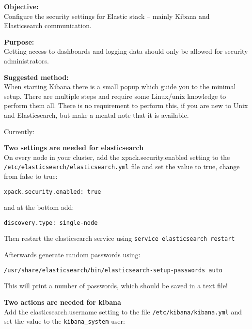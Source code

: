 \documentclass[a4paper,11pt,notitlepage]{report}
\begin{document}
{\bf Objective:}\\
Configure the security settings for Elastic stack -- mainly Kibana and Elasticsearch communication.

{\bf Purpose:}\\
Getting access to dashboards and logging data should only be allowed for security administrators.

{\bf Suggested method:}\\
When starting Kibana there is a small popup which guide you to the minimal setup. There are multiple steps and require some Linux/unix knowledge to perform them all. There is no requirement to perform this, if you are new to Unix and Elasticsearch, but make a mental note that it is available.

Currently:\\

{\bf Two settings are needed for elasticsearch}\\
On every node in your cluster, add the xpack.security.enabled setting to the
\verb+/etc/elasticsearch/elasticsearch.yml+ file and set the value to true, change from false to true:

\begin{verbatim}
xpack.security.enabled: true
\end{verbatim}

and at the bottom add:

\begin{verbatim}
discovery.type: single-node
\end{verbatim}

Then restart the elasticsearch service using \verb+service elasticsearch restart+

Afterwards generate random passwords using:

\begin{verbatim}
/usr/share/elasticsearch/bin/elasticsearch-setup-passwords auto
\end{verbatim}

This will print a number of passwords, which should be saved in a text file!


{\bf Two actions are needed for kibana}\\
Add the elasticsearch.username setting to the file \verb+/etc/kibana/kibana.yml+ and set the value to the \verb+kibana_system+ user:
\end{document}
